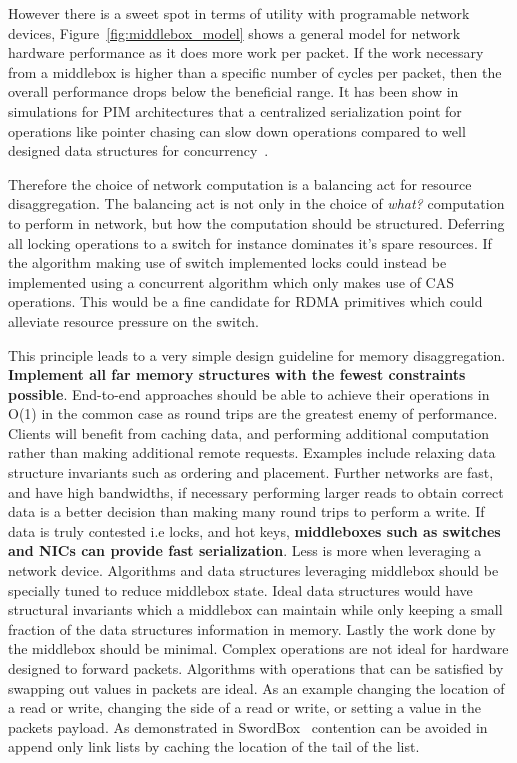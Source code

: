 However there is a sweet spot in terms of utility with programable network
devices, Figure~\ref{fig:middlebox_model} shows a general model for network hardware
performance as it does more work per packet. If the work necessary from a
middlebox is higher than a specific number of cycles per packet, then the
overall performance drops below the beneficial range. It has been show in
simulations for PIM architectures that a centralized serialization point for
operations like pointer chasing can slow down operations compared to well
designed data structures for concurrency~.

Therefore the choice of network computation is a balancing act for resource
disaggregation. The balancing act is not only in the choice of \textit{what?}
computation to perform in network, but how the computation should be structured.
Deferring all locking operations to a switch for instance dominates it's spare
resources. If the algorithm making use of switch implemented locks could instead
be implemented using a concurrent algorithm which only makes use of CAS
operations. This would be a fine candidate for RDMA primitives which could
alleviate resource pressure on the switch.

This principle leads to a very simple design guideline for memory
disaggregation. \textbf{Implement all far memory structures with the fewest
constraints possible}. End-to-end approaches should be able to achieve their
operations in O(1) in the common case as round trips are the greatest enemy of
performance.  Clients will benefit from caching data, and performing additional
computation rather than making additional remote requests. Examples include
relaxing data structure invariants such as ordering and placement. Further
networks are fast, and have high bandwidths, if necessary performing larger
reads to obtain correct data is a better decision than making many round trips
to perform a write. If data is truly contested i.e locks, and hot keys,
\textbf{middleboxes such as switches and NICs can provide fast serialization}.
Less is more when leveraging a network device. Algorithms and data structures
leveraging middlebox should be specially tuned to reduce middlebox state. Ideal
data structures would have structural invariants which a middlebox can maintain
while only keeping a small fraction of the data structures information in
memory. Lastly the work done by the middlebox should be minimal. Complex
operations are not ideal for hardware designed to forward packets. Algorithms
with operations that can be satisfied by swapping out values in packets are
ideal. As an example changing the location of a read or write, changing the side
of a read or write, or setting a value in the packets payload. As demonstrated
in SwordBox~\cite{Grant2021InContRes} contention can be avoided in append only
link lists by caching the location of the tail of the list.

